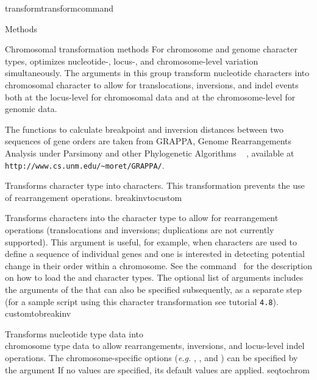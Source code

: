 \begin{command}{transform}{transformcommand}
\begin{arguments}
\begin{argumentgroup}{Methods}
      \end{argumentgroup}
           
       \begin{argumentgroup}{Chromosomal transformation methods}
           For chromosome and genome character types, \poy optimizes nucleotide-, 
           locus-, and chromosome-level variation simultaneously. The arguments in this group
           transform nucleotide characters into chromosomal character
           to allow for translocations, inversions, and indel events both at the locus-level for chromosomal data
           and at the chromosome-level for genomic data.
           
          The functions to calculate breakpoint and inversion distances between two
	sequences of gene orders are taken from GRAPPA, Genome
	Rearrangements Analysis under Parsimony and other Phylogenetic Algorithms ~     \cite{baderetal2002},
	available at \texttt{http://www.cs.unm.edu/\~{}moret/GRAPPA/}.
	
            {Transforms  character type into  characters.
            This transformation prevents the use of rearrangement operations.} 
            {breakinvtocustom}

            {Transforms  characters into the  character type to 
            allow for rearrangement operations (translocations and inversions; duplications are not currently supported).  
            This argument is useful, for example, when  characters are used to define a sequence of
            individual genes and one is interested in detecting potential change in their order within a chromosome. 
            See the command~ for the description on how to load the  and  character types. The optional list of arguments
            includes the arguments of the  that can also
            be specified subsequently, as a separate step (for a sample script using this character transformation see tutorial \texttt{4.8}).}
            {customtobreakinv}
             
           {Transforms nucleotide type data into \\ chromosome type data to allow
            rearrangements, inversions, and locus-level indel operations.  The
            chromosome-specific options (\emph{e.g.}  , 
            , and ) can be specified by the argument
             If no  values
           are specified, its default values are applied.}
           {seqtochrom}
           

\end{argumentgroup}
\end{arguments}
\end{command}
